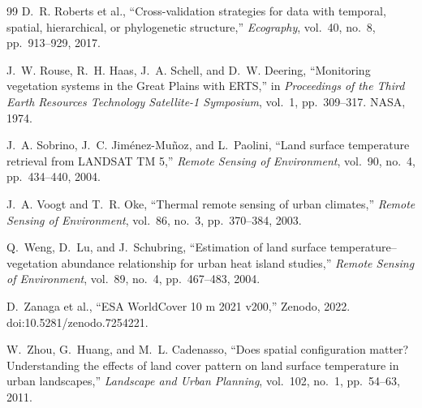\documentclass[11pt,a4paper]{article}
\begin{document}
\begin{thebibliography}{99}
 D.~R. Roberts et al., ``Cross-validation strategies for data with temporal, spatial, hierarchical, or phylogenetic structure,'' \emph{Ecography}, vol.~40, no.~8, pp.~913--929, 2017.

 J.~W. Rouse, R.~H. Haas, J.~A. Schell, and D.~W. Deering, ``Monitoring vegetation systems in the Great Plains with ERTS,'' in \emph{Proceedings of the Third Earth Resources Technology Satellite-1 Symposium}, vol.~1, pp.~309--317. NASA, 1974.

 J.~A. Sobrino, J.~C. Jiménez-Muñoz, and L.~Paolini, ``Land surface temperature retrieval from LANDSAT TM 5,'' \emph{Remote Sensing of Environment}, vol.~90, no.~4, pp.~434--440, 2004.

 J.~A. Voogt and T.~R. Oke, ``Thermal remote sensing of urban climates,'' \emph{Remote Sensing of Environment}, vol.~86, no.~3, pp.~370--384, 2003.

 Q.~Weng, D.~Lu, and J.~Schubring, ``Estimation of land surface temperature–vegetation abundance relationship for urban heat island studies,'' \emph{Remote Sensing of Environment}, vol.~89, no.~4, pp.~467--483, 2004.

 D.~Zanaga et al., ``ESA WorldCover 10 m 2021 v200,'' Zenodo, 2022. doi:10.5281/zenodo.7254221.

 W.~Zhou, G.~Huang, and M.~L. Cadenasso, ``Does spatial configuration matter? Understanding the effects of land cover pattern on land surface temperature in urban landscapes,'' \emph{Landscape and Urban Planning}, vol.~102, no.~1, pp.~54--63, 2011.

\end{thebibliography}
\end{document}
